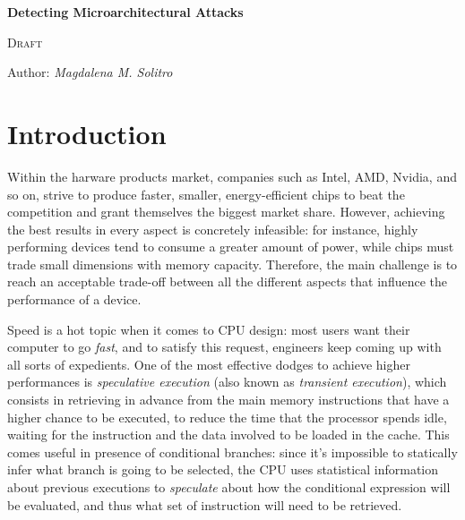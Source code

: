 \documentclass[12pt,a4paper]{book}
\theoremstyle{definition}
\begin{document}
	
	\begin{titlepage}
		\begin{center}
			\vspace*{1cm}
			
			\Huge
			\textbf{\Huge Detecting Microarchitectural Attacks}
			
			\vspace{0.3cm}
			\LARGE \textsc{Draft}
			
			\vspace{1.5cm}
			
			\large Author: \textit{Magdalena M. Solitro}
			
			\vfill
		\end{center}
	\end{titlepage}
	
	\tableofcontents
	
	\mainmatter

	\chapter{Introduction}\label{chapter:intro}
	Within the harware products market, companies such as Intel, AMD, Nvidia, and so on, strive to produce faster, smaller, energy-efficient chips to beat the competition and grant themselves the biggest market share. However, achieving the best results in every aspect is concretely infeasible: for instance, highly performing devices tend to consume a greater amount of power, while chips must trade small dimensions with memory capacity. Therefore, the main challenge is to reach an acceptable trade-off between all the different aspects that influence the performance of a device.

	Speed is a hot topic when it comes to CPU design: most users want their computer to go \textit{fast}, and to satisfy this request, engineers keep coming up with all sorts of expedients. One of the most effective dodges to achieve higher performances is \textit{speculative execution} (also known as \textit{transient execution}), which consists in retrieving in advance from the main memory instructions that have a higher chance to be executed, to reduce the time that the processor spends idle, waiting for the instruction and the data involved to be loaded in the cache. 
	This comes useful in presence of conditional branches: since it's impossible to statically infer what branch is going to be selected, the CPU uses statistical information about previous executions to \textit{speculate} about how the conditional expression will be evaluated, and thus what set of instruction will need to be retrieved.
	
\end{document}
